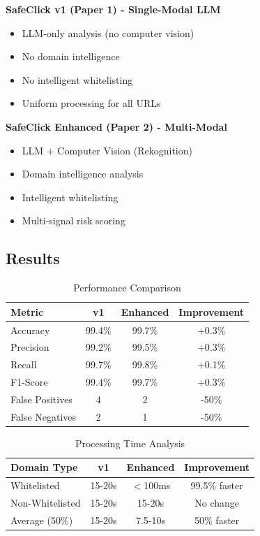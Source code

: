 \documentclass[conference]{IEEEtran}
\begin{document}
\textbf{SafeClick v1 (Paper 1) - Single-Modal LLM}
\begin{itemize}
\item LLM-only analysis (no computer vision)
\item No domain intelligence
\item No intelligent whitelisting
\item Uniform processing for all URLs
\end{itemize}

\textbf{SafeClick Enhanced (Paper 2) - Multi-Modal}
\begin{itemize}
\item LLM + Computer Vision (Rekognition)
\item Domain intelligence analysis
\item Intelligent whitelisting
\item Multi-signal risk scoring
\end{itemize}


\subsection{Results}

\begin{table}[htbp]
\caption{Performance Comparison}
\begin{center}
\begin{tabular}{|l|c|c|c|}
\hline
\textbf{Metric} & \textbf{v1} & \textbf{Enhanced} & \textbf{Improvement} \\
\hline
Accuracy & 99.4\% & 99.7\% & +0.3\% \\
\hline
Precision & 99.2\% & 99.5\% & +0.3\% \\
\hline
Recall & 99.7\% & 99.8\% & +0.1\% \\
\hline
F1-Score & 99.4\% & 99.7\% & +0.3\% \\
\hline
False Positives & 4 & 2 & -50\% \\
\hline
False Negatives & 2 & 1 & -50\% \\
\hline
\end{tabular}
\end{center}
\end{table}

\begin{table}[htbp]
\caption{Processing Time Analysis}
\begin{center}
\begin{tabular}{|l|c|c|c|}
\hline
\textbf{Domain Type} & \textbf{v1} & \textbf{Enhanced} & \textbf{Improvement} \\
\hline
Whitelisted & 15-20s & $<$100ms & 99.5\% faster \\
\hline
Non-Whitelisted & 15-20s & 15-20s & No change \\
\hline
Average (50\%) & 15-20s & 7.5-10s & 50\% faster \\
\hline
\end{tabular}
\end{center}
\end{table}
\end{document}
